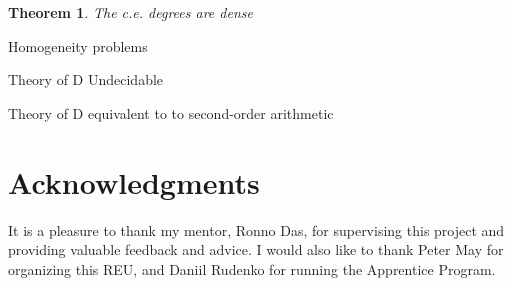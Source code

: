 \documentclass[psamsfonts]{amsart}
\newtheorem{thm}{Theorem}[section]
\theoremstyle{definition}
\theoremstyle{remark}
\numberwithin{equation}{section}
\begin{document}
\begin{thm}
  The c.e. degrees are dense
  \cite{sacks64:_recur_enumer_degrees_dense}
\end{thm}

Homogeneity problems

Theory of D Undecidable


Theory of D equivalent to to second-order arithmetic \cite{simpson77:_first_order_theor_degrees_recur_unsol}





\section*{Acknowledgments}
It is a pleasure to thank my mentor, Ronno Das, for supervising this project and
providing valuable feedback and advice. I would also like to thank Peter May for
organizing this REU, and Daniil Rudenko for running the Apprentice Program.

\printbibliography
\end{document}
